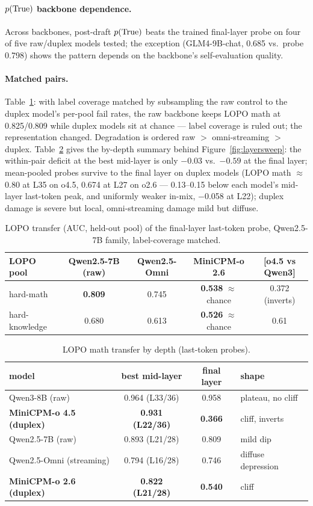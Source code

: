 \paragraph{$p(\mathrm{True})$ backbone dependence.} Across backbones, post-draft
$p(\mathrm{True})$ beats the trained final-layer probe on four of five raw/duplex
models tested; the exception (GLM4-9B-chat, 0.685 vs.\ probe 0.798) shows
the pattern depends on the backbone's self-evaluation quality.

\paragraph{Matched pairs.} Table~\ref{tab:lopo}: with label coverage
matched by subsampling the raw control to the duplex model's per-pool
fail rates, the raw backbone keeps LOPO math at 0.825/0.809 while duplex
models sit at chance --- label coverage is ruled out; the
representation changed. Degradation is ordered raw $>$ omni-streaming
$>$ duplex. Table~\ref{tab:sweep} gives the by-depth summary behind
Figure~\ref{fig:layersweep}: the within-pair deficit at the best
mid-layer is only $-0.03$ vs.\ $-0.59$ at the final layer; mean-pooled
probes survive to the final layer on duplex models (LOPO math
$\approx$0.80 at L35 on o4.5, 0.674 at L27 on o2.6 --- 0.13--0.15
below each model's mid-layer last-token peak, and uniformly weaker
in-mix, $-$0.058 at L22); duplex damage is
severe but local, omni-streaming damage mild but diffuse.

\begin{table}[h]
\centering\small
\caption{LOPO transfer (AUC, held-out pool) of the final-layer
last-token probe, Qwen2.5-7B family, label-coverage matched.}
\label{tab:lopo}
\begin{tabular}{lcccc}
\toprule
LOPO pool & Qwen2.5-7B (raw) & Qwen2.5-Omni & MiniCPM-o 2.6 & [o4.5 vs Qwen3] \\
\midrule
hard-math & \textbf{0.809} & 0.745 & \textbf{0.538} $\approx$ chance & 0.372 (inverts) \\
hard-knowledge & 0.680 & 0.613 & \textbf{0.526} $\approx$ chance & 0.61 \\
\bottomrule
\end{tabular}
\end{table}

\begin{table}[h]
\centering\small
\caption{LOPO math transfer by depth (last-token probes).}
\label{tab:sweep}
\begin{tabular}{lccl}
\toprule
model & best mid-layer & final layer & shape \\
\midrule
Qwen3-8B (raw) & 0.964 (L33/36) & 0.958 & plateau, no cliff \\
\textbf{MiniCPM-o 4.5 (duplex)} & \textbf{0.931 (L22/36)} & \textbf{0.366} & cliff, inverts \\
Qwen2.5-7B (raw) & 0.893 (L21/28) & 0.809 & mild dip \\
Qwen2.5-Omni (streaming) & 0.794 (L16/28) & 0.746 & diffuse depression \\
\textbf{MiniCPM-o 2.6 (duplex)} & \textbf{0.822 (L21/28)} & \textbf{0.540} & cliff \\
\bottomrule
\end{tabular}
\end{table}

